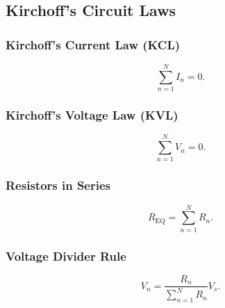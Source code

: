 \subsection{Kirchoff's Circuit Laws}

\subsubsection{Kirchoff's Current Law (KCL)}
\begin{equation*}
  \sum_{n = 1}^{N} I_n = 0
.\end{equation*}

\begin{symbols}
\end{symbols}

\subsubsection{Kirchoff's Voltage Law (KVL)}
\begin{equation*}
  \sum_{n = 1}^{N} V_n = 0
.\end{equation*}

\begin{symbols}
\end{symbols}

\subsubsection{Resistors in Series}
\begin{equation*}
  R_{\mathrm{EQ}} = \sum_{n = 1}^{N} R_n
.\end{equation*}

\begin{symbols}
\end{symbols}

\subsubsection{Voltage Divider Rule}
\begin{equation*}
  V_n = \frac{R_n}{\sum_{n = 1}^{N} R_n} V_s
.\end{equation*}

\begin{symbols}
\end{symbols}

